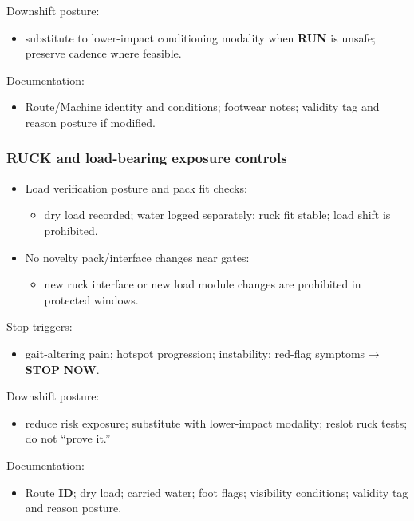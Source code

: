 \documentclass[10pt]{article}
\begin{document}
Downshift posture:

\begin{itemize}
\item substitute to lower-impact conditioning modality when \textbf{RUN} is unsafe; preserve cadence where feasible.
\end{itemize}

Documentation:

\begin{itemize}
\item Route/Machine identity and conditions; footwear notes; validity tag and reason posture if modified.
\end{itemize}

\subsubsection*{\textbf{RUCK} and load-bearing exposure controls}

\begin{itemize}
\item Load verification posture and pack fit checks:
\begin{itemize}
\item dry load recorded; water logged separately; ruck fit stable; load shift is prohibited.
\end{itemize}
\item No novelty pack/interface changes near gates:
\begin{itemize}
\item new ruck interface or new load module changes are prohibited in protected windows.
\end{itemize}
\end{itemize}

Stop triggers:

\begin{itemize}
\item gait-altering pain; hotspot progression; instability; red-flag symptoms → \textbf{STOP} \textbf{NOW}.
\end{itemize}

Downshift posture:

\begin{itemize}
\item reduce risk exposure; substitute with lower-impact modality; reslot ruck tests; do not “prove it.”
\end{itemize}

Documentation:

\begin{itemize}
\item Route \textbf{ID}; dry load; carried water; foot flags; visibility conditions; validity tag and reason posture.
\end{itemize}
\end{document}

